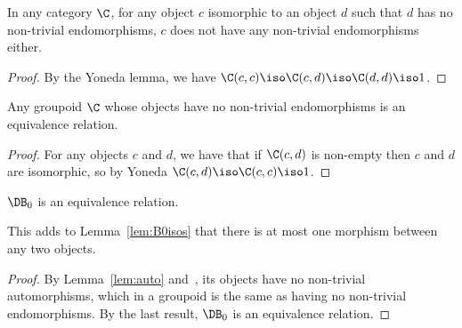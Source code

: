 \documentclass{LMCS}
\theoremstyle{plain}\newtheorem{satz}[thm]{Satz}
\begin{document}
\begin{lem}\label{lem:auto}
  In any category $\C$, for any object $c$ isomorphic to an object $d$ such
  that $d$ has no non-trivial endomorphisms, $c$ does not have any
  non-trivial endomorphisms either.
\end{lem}
\begin{proof}
  By the Yoneda lemma, we have $\C(c,c) \iso \C(c,d) \iso \C(d,d) \iso
  1$.
\end{proof}

\begin{lem}
   Any groupoid $\C$ whose objects have no non-trivial endomorphisms
   is an equivalence relation.
\end{lem}
\begin{proof}
  For any objects $c$ and $d$, we have that if $\C(c,d)$ is non-empty
  then $c$ and $d$ are isomorphic, so by Yoneda $\C(c,d) \iso \C(c,c)
  \iso 1$.
\end{proof}

\begin{cor}\label{cor:B0eqrel}
$\DB_0$ is an equivalence relation.  
\end{cor}
This adds to Lemma~\ref{lem:B0isos} that there is at most one morphism
between any two objects.
  \begin{proof}
    By Lemma~\ref{lem:auto} and~, its objects have no
    non-trivial automorphisms, which in a groupoid is the same as
    having no non-trivial endomorphisms. By the last result, $\DB_0$
    is an equivalence relation.
  \end{proof}
\end{document}
